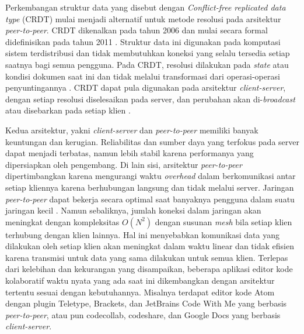 Perkembangan struktur data yang disebut dengan \textit{Conflict-free replicated data type} (CRDT) mulai menjadi alternatif untuk metode resolusi pada arsitektur \textit{peer-to-peer}. CRDT dikenalkan pada tahun 2006 dan mulai secara formal didefinisikan pada tahun 2011 \citep{Shapiro2011}. Struktur data ini digunakan pada komputasi sistem terdistribusi dan tidak membutuhkan koneksi yang selalu tersedia setiap saatnya bagi semua pengguna. Pada CRDT, resolusi dilakukan pada \textit{state} atau kondisi dokumen saat ini dan tidak melalui transformasi dari operasi-operasi penyuntingannya \citep{CRDToverview1}. CRDT dapat pula digunakan pada arsitektur \textit{client-server}, dengan setiap resolusi diselesaikan pada server, dan perubahan akan di-\textit{broadcast} atau disebarkan pada setiap klien \citep{Sun2019First}.

Kedua arsitektur, yakni \textit{client-server} dan \textit{peer-to-peer} memiliki banyak keuntungan dan kerugian. Reliabilitas dan sumber daya yang terfokus pada server dapat menjadi terbatas, namun lebih stabil karena performanya yang dipersiapkan oleh pengembang. Di lain sisi, arsitektur \textit{peer-to-peer} dipertimbangkan karena mengurangi waktu \textit{overhead} dalam berkomunikasi antar setiap kliennya karena berhubungan langsung dan tidak melalui server. Jaringan \textit{peer-to-peer} dapat bekerja secara optimal saat banyaknya pengguna dalam suatu jaringan kecil \citep{leibnitz2007peer, maly2003comparison}. Namun sebaliknya, jumlah koneksi dalam jaringan akan meningkat dengan kompleksitas $O(N^2)$ dengan susunan \textit{mesh} bila setiap klien terhubung dengan klien lainnya. Hal ini menyebabkan komunikasi data yang dilakukan oleh setiap klien akan meningkat dalam waktu linear dan tidak efisien karena transmisi untuk data yang sama dilakukan untuk semua klien. Terlepas dari kelebihan dan kekurangan yang disampaikan, beberapa aplikasi editor kode kolaboratif waktu nyata yang ada saat ini dikembangkan dengan arsitektur tertentu sesuai dengan kebutuhannya. Misalnya terdapat editor kode Atom dengan plugin Teletype, Brackets, dan JetBrains Code With Me yang berbasis \textit{peer-to-peer}, atau pun codecollab, codeshare, dan Google Docs yang berbasis \textit{client-server}.

